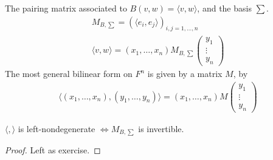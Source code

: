 \documentclass[class=scrartcl, crop=false]{standalone}
\begin{document}
\begin{definition}
  The pairing matrix associated to $B(v, w) = \langle v, w \rangle$, and the basis $\sum$.
  \begin{gather*}
    M_{B, \sum} = (\langle e_i, e_j \rangle)_{i, j = 1, \dots, n}  \\
    \langle v, w \rangle = (x_1, \dots, x_n)M_{B, \sum}
    \begin{pmatrix}
      y_1 \\
      \vdots \\
      y_n
    \end{pmatrix} 
  \end{gather*} 
  The most general bilinear form on $F^n$ is given by a matrix $M$, by 
  \begin{gather*}
    \langle (x_1, \dots, x_n), (y_1, \dots, y_n) \rangle = (x_1, \dots, x_n)M
    \begin{pmatrix}
      y_1 \\
      \vdots \\
      y_n
    \end{pmatrix} 
  \end{gather*} 
\end{definition} 

\begin{lemma}
  $\langle, \rangle$ is left-nondegenerate $\Leftrightarrow M_{B, \sum}$ is invertible.
  \begin{proof}
    Left as exercise.
  \end{proof} 
\end{lemma} 
\end{document}
